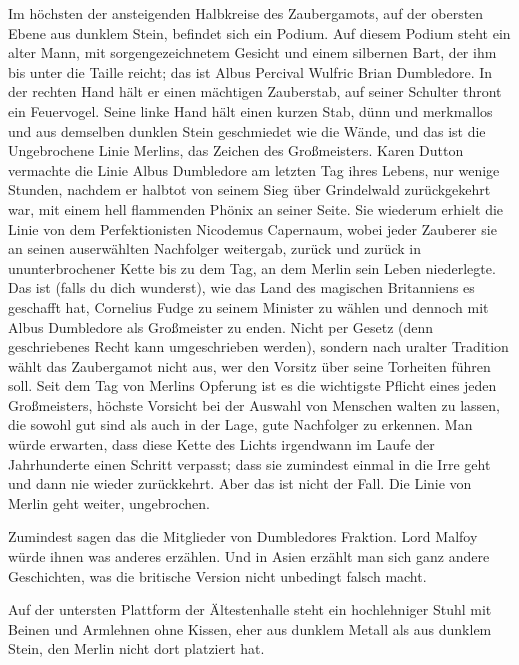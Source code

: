 Im höchsten der ansteigenden Halbkreise des Zaubergamots, auf der obersten Ebene aus dunklem Stein, befindet sich ein Podium. Auf diesem Podium steht ein alter Mann, mit sorgengezeichnetem Gesicht und einem silbernen Bart, der ihm bis unter die Taille reicht; das ist Albus Percival Wulfric Brian Dumbledore. In der rechten Hand hält er einen mächtigen Zauberstab, auf seiner Schulter thront ein Feuervogel. Seine linke Hand hält einen kurzen Stab, dünn und merkmallos und aus demselben dunklen Stein geschmiedet wie die Wände, und das ist die Ungebrochene Linie Merlins, das Zeichen des Großmeisters. Karen Dutton vermachte die Linie Albus Dumbledore am letzten Tag ihres Lebens, nur wenige Stunden, nachdem er halbtot von seinem Sieg über Grindelwald zurückgekehrt war, mit einem hell flammenden Phönix an seiner Seite. Sie wiederum erhielt die Linie von dem Perfektionisten Nicodemus Capernaum, wobei jeder Zauberer sie an seinen auserwählten Nachfolger weitergab, zurück und zurück in ununterbrochener Kette bis zu dem Tag, an dem Merlin sein Leben niederlegte. Das ist (falls du dich wunderst), wie das Land des magischen Britanniens es geschafft hat, Cornelius Fudge zu seinem Minister zu wählen und dennoch mit Albus Dumbledore als Großmeister zu enden. Nicht per Gesetz (denn geschriebenes Recht kann umgeschrieben werden), sondern nach uralter Tradition wählt das Zaubergamot nicht aus, wer den Vorsitz über seine Torheiten führen soll. Seit dem Tag von Merlins Opferung ist es die wichtigste Pflicht eines jeden Großmeisters, höchste Vorsicht bei der Auswahl von Menschen walten zu lassen, die sowohl gut sind als auch in der Lage, gute Nachfolger zu erkennen. Man würde erwarten, dass diese Kette des Lichts irgendwann im Laufe der Jahrhunderte einen Schritt verpasst; dass sie zumindest einmal in die Irre geht und dann nie wieder zurückkehrt. Aber das ist nicht der Fall. Die Linie von Merlin geht weiter, ungebrochen.

Zumindest sagen das die Mitglieder von Dumbledores Fraktion. Lord Malfoy würde ihnen was anderes erzählen. Und in Asien erzählt man sich ganz andere Geschichten, was die britische Version nicht unbedingt falsch macht.

Auf der untersten Plattform der Ältestenhalle steht ein hochlehniger Stuhl mit Beinen und Armlehnen ohne Kissen, eher aus dunklem Metall als aus dunklem Stein, den Merlin nicht dort platziert hat.

